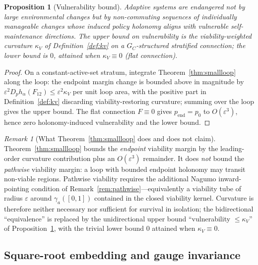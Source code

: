 \documentclass[11pt,a4paper]{article}
\theoremstyle{plain}
\newtheorem{proposition}[theorem]{Proposition}
\theoremstyle{definition}
\theoremstyle{remark}
\newtheorem{remark}[theorem]{Remark}
\newcommand{\kk}{\kappa_{\!V}}
\begin{document}
\begin{proposition}[Vulnerability bound]
\label{prop:vulnerability}
Adaptive systems are endangered not by large environmental changes
but by non-commuting sequences of individually manageable changes
whose induced policy holonomy aligns with vulnerable
self-maintenance directions. The upper bound on vulnerability is
the viability-weighted curvature $\kk$ of Definition~\ref{def:kv} on
a $G_C$-structured stratified connection; the lower bound is $0$,
attained when $\kk \equiv 0$ (flat connection).
\end{proposition}

\begin{proof}
On a constant-active-set stratum, integrate
Theorem~\ref{thm:smallloop} along the loop: the endpoint margin
change is bounded above in magnitude by
$\varepsilon^2 D_p h_\alpha(F_{12}) \leq \varepsilon^2 \kk$ per unit
loop area, with the positive part in Definition~\ref{def:kv}
discarding viability-restoring curvature; summing over the loop
gives the upper bound. The flat connection $F \equiv 0$ gives
$p_{\mathrm{end}} = p_0$ to $O(\varepsilon^3)$, hence zero
holonomy-induced vulnerability and the lower bound.
\end{proof}

\begin{remark}[What Theorem~\ref{thm:smallloop} does and does not claim]
\label{rem:smallloop-scope}
Theorem~\ref{thm:smallloop} bounds the \emph{endpoint} viability
margin by the leading-order curvature contribution plus an
$O(\varepsilon^3)$ remainder. It does \emph{not} bound the
\emph{pathwise} viability margin: a loop with bounded endpoint
holonomy may transit non-viable regions. Pathwise viability requires
the additional Nagumo inward-pointing condition of
Remark~\ref{rem:pathwise}---equivalently a viability tube of radius
$\varepsilon$ around $\gamma_a([0,1])$ contained in the closed
viability kernel. Curvature is therefore neither necessary nor
sufficient for survival in isolation; the bidirectional
``equivalence'' is replaced by the unidirectional upper bound
``vulnerability $\leq \kk$'' of Proposition~\ref{prop:vulnerability},
with
the trivial lower bound $0$ attained when $\kk \equiv 0$.
\end{remark}

\subsection{Square-root embedding and gauge invariance}
\end{document}
